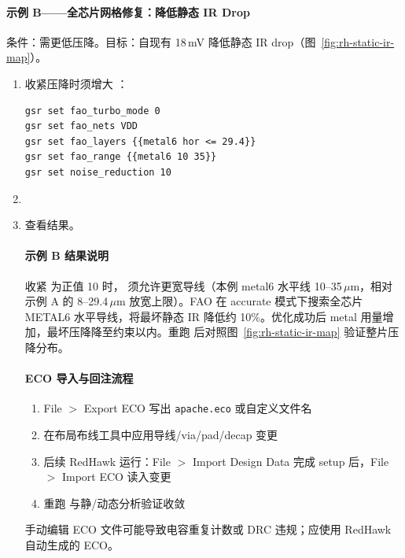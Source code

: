 \paragraph{示例 B——全芯片网格修复：降低静态 IR Drop}
条件：需更低压降。目标：自现有 18\,mV 降低静态 IR drop（图~\ref{fig:rh-static-ir-map}）。
\begin{enumerate}
  \item 收紧压降时须增大 ：
\begin{lstlisting}
gsr set fao_turbo_mode 0
gsr set fao_nets VDD
gsr set fao_layers {{metal6 hor <= 29.4}}
gsr set fao_range {{metal6 10 35}}
gsr set noise_reduction 10
\end{lstlisting}
  \item {}
  \item 查看结果。
\paragraph{示例 B 结果说明}
收紧  为正值 10 时， 须允许更宽导线（本例 metal6 水平线 10--35\,$\mu$m，相对示例 A 的 8--29.4\,$\mu$m 放宽上限）。FAO 在 accurate 模式下搜索全芯片 METAL6 水平导线，将最坏静态 IR 降低约 10\%。优化成功后 metal 用量增加，最坏压降降至约束以内。重跑  后对照图~\ref{fig:rh-static-ir-map} 验证整片压降分布。

\paragraph{ECO 导入与回注流程}
\begin{enumerate}
  \item File $>$ Export ECO 写出 \texttt{apache.eco} 或自定义文件名
  \item 在布局布线工具中应用导线/via/pad/decap 变更
  \item 后续 RedHawk 运行：File $>$ Import Design Data 完成 setup 后，File $>$ Import ECO 读入变更
  \item 重跑  与静/动态分析验证收敛
\end{enumerate}

\begin{noteBox}
手动编辑 ECO 文件可能导致电容重复计数或 DRC 违规；应使用 RedHawk 自动生成的 ECO。
\end{noteBox}

\end{enumerate}

\label{fig:rh-static-ir-map}

